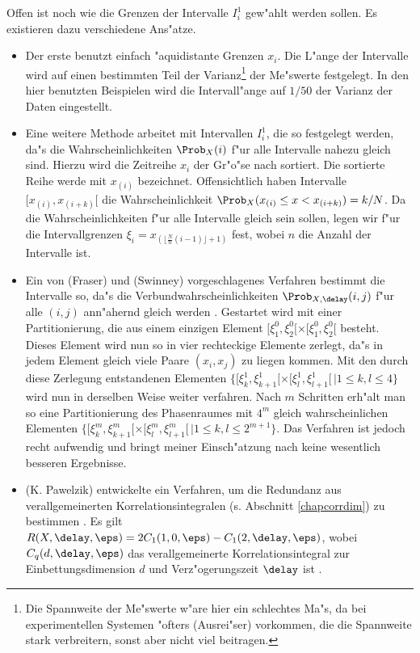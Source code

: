 Offen ist noch wie die Grenzen der Intervalle $I^1_i$ gew"ahlt werden sollen. Es
existieren dazu verschiedene Ans"atze.
\begin{itemize}
\item Der erste benutzt einfach "aquidistante Grenzen $x_i$. Die L"ange der Intervalle
  wird auf einen bestimmten Teil der Varianz\footnote{Die Spannweite der Me"swerte w"are
    hier ein schlechtes Ma"s, da bei experimentellen Systemen "ofters \slang(Ausrei"ser)
    vorkommen, die die Spannweite stark verbreitern, sonst aber nicht viel beitragen.} der
  Me"swerte festgelegt. In den hier benutzten Beispielen wird die Intervall"ange auf
  $1/50$ der Varianz der Daten eingestellt.
\item Eine weitere Methode arbeitet mit Intervallen $I^1_i$, die so festgelegt werden,
  da"s die Wahrscheinlichkeiten $\Prob_X(i)$ f"ur alle Intervalle nahezu gleich sind.
  Hierzu wird die Zeitreihe $x_i$ der Gr"o"se nach sortiert. Die sortierte Reihe werde mit
  $x_{(i)}$ bezeichnet.  Offensichtlich haben Intervalle $[x_{(i)},x_{(i+k)}[$ die
  Wahrscheinlichkeit $\Prob_X(x_{(i)}\leq x<x_{(i+k)})=k/N$. Da die Wahrscheinlichkeiten
  f"ur alle Intervalle gleich sein sollen, legen wir f"ur die Intervallgrenzen
  $\xi_i=x_{(\lfloor\frac{N}{n}(i-1)\rfloor+1)}$ fest, wobei $n$ die Anzahl der Intervalle
  ist.
\item Ein von \autor(Fraser) und \autor(Swinney) vorgeschlagenes Verfahren bestimmt die
  Intervalle so, da"s die Verbundwahrscheinlichkeiten $\Prob_{X,\delay}(i,j)$ f"ur alle
  $(i,j)$ ann"ahernd gleich werden \cite{Fraser-swinney}. Gestartet wird mit einer
  Partitionierung, die aus einem einzigen Element
  $[\xi^0_1,\xi^0_2[\times[\xi^0_1,\xi^0_2[$ besteht. Dieses Element wird nun so in vier
  rechteckige Elemente zerlegt, da"s in jedem Element gleich viele Paare $(x_i,x_j)$ zu
  liegen kommen. Mit den durch diese Zerlegung entstandenen Elementen $\{
  [\xi^1_k,\xi^1_{k+1} [ \times [\xi^1_l, \xi^1_{l+1} [ \, \vert 1 \leq k , l \leq 4\}$
  wird nun in derselben Weise weiter verfahren. Nach $m$ Schritten erh"alt man so eine
  Partitionierung des Phasenraumes mit $4^m$ gleich wahrscheinlichen Elementen
  $\{[\xi^m_k,\xi^m_{k+1}[\times[\xi^m_l,\xi^m_{l+1}[\,\vert 1\leq k,l \leq 2^{m+1}\}$.
  Das Verfahren ist jedoch recht aufwendig und bringt meiner Einsch"atzung nach keine
  wesentlich besseren Ergebnisse.
\item \autor(K. Pawelzik) entwickelte ein Verfahren, um die Redundanz aus
  verallgemeinerten Korrelationsintegralen (s. Abschnitt \ref{chapcorrdim}) zu bestimmen \cite{Pawelzik91}.
  Es gilt $R(X,\delay,\eps)=2C_1(1,0,\eps)-C_1(2,\delay,\eps)$, wobei $C_q(d,\delay,\eps)$
  das verallgemeinerte Korrelationsintegral zur Einbettungsdimension $d$ und 
  Verz"ogerungszeit $\delay$ ist \cite{Pawelzik-schuster}.
\end{itemize}


